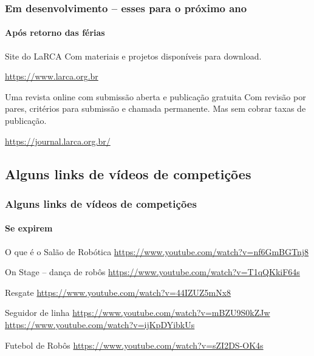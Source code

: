\documentclass{beamer}
\begin{document}
\begin{frame}
	\frametitle{Em desenvolvimento -- esses para o próximo ano}
	\framesubtitle{Após retorno das férias}
	\begin{block}{Site do LaRCA}
		Com materiais e projetos disponíveis para download.
		
		\url{https://www.larca.org.br}
	\end{block}

	\begin{block}{Uma revista online com submissão aberta e publicação gratuita}
		Com revisão por pares, critérios para submissão e chamada permanente. Mas sem cobrar taxas de publicação.
		
		\url{https://journal.larca.org.br/}
	\end{block}

\end{frame}

\subsection{Alguns links de vídeos de competições}
\begin{frame}
   \frametitle{Alguns links de vídeos de competições}
   \framesubtitle{Se expirem}
   
   	\begin{block}{O que é o Salão de Robótica}
   		\url{https://www.youtube.com/watch?v=nf6GmBGTnj8}
	\end{block}

	\begin{block}{On Stage -- dança de robôs}
		\url{https://www.youtube.com/watch?v=T1qQKkiF64s}
	\end{block}
	
	\begin{block}{Resgate}
		\url{https://www.youtube.com/watch?v=44IZUZ5mNx8}
	\end{block}
	
	\begin{block}{Seguidor de linha}
		\url{https://www.youtube.com/watch?v=mBZU9S0kZJw}
		\url{https://www.youtube.com/watch?v=ijKpDYibkUs}
	\end{block}	

	\begin{block}{Futebol de Robôs}
	\url{https://www.youtube.com/watch?v=sZI2DS-OK4s}
	\end{block}	
	
	
\end{frame}
\end{document}
